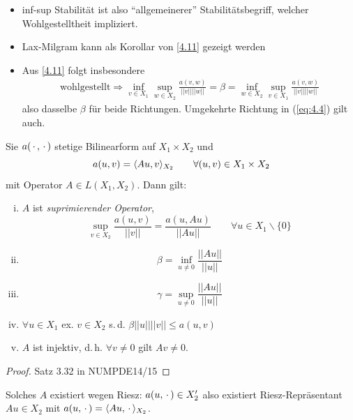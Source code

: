 \begin{bem} \beginwithlistbem
\begin{itemize}
	\item inf-sup Stabilität ist also ``allgemeinerer'' Stabilitätsbegriff, welcher Wohlgestelltheit impliziert.
	\item Lax-Milgram kann als Korollar von \ref{4.11} gezeigt werden
	\item Aus \ref{4.11} folgt insbesondere
	\begin{align} \label{eq:4.4}
		\text{wohlgestellt} \Rightarrow \inf\limits_{v \in X_1} \sup\limits_{w \in X_2} \frac{a(v,w)}{||v|| ||w||} = \beta = \inf\limits_{w \in X_2} \sup\limits_{v \in X_1} \frac{a(v,w)}{||v|| ||w||}
	\end{align}
	also dasselbe $\beta$ für beide Richtungen. Umgekehrte Richtung in (\ref{eq:4.4}) gilt auch.
\end{itemize}
\end{bem}

\begin{satz} \label{4.12}
Sie $a(\,\cdot\,,\,\cdot\,)$ stetige Bilinearform auf $X_1 \times X_2$ und
\[
	a(u,v) = \langle Au, v \rangle_{X_2} \qquad \forall (u,v) \in X_1 \times X_2
\]
mit Operator $A \in L(X_1,X_2)$. Dann gilt:
\begin{enumerate}[i)]
	\item $A$ ist \emph{suprimierender Operator},
	\[
		\sup\limits_{v \in X_2} \frac{a(u,v)}{||v||} = \frac{a(u,Au)}{||Au||} \qquad \forall u \in X_1 \backslash \{0\}
	\]
	\item \[
		\beta = \inf\limits_{u \neq 0} \frac{||Au||}{||u||}
	\]
	\item \[
		\gamma = \sup\limits_{u \neq 0} \frac{||Au||}{||u||}
	\]
	\item $\forall u \in X_1$ ex. $v \in X_2$ s.\,d. $\beta ||u|| ||v|| \leq a(u,v)$
	\item $A$ ist injektiv, d.\,h. $\forall v \neq 0$ gilt $Av \neq 0$.
\end{enumerate}
\begin{proof}
	Satz 3.32 in NUMPDE14/15
\end{proof}
\end{satz}

\begin{bem}
Solches $A$ existiert wegen Riesz: $a(u,\,\cdot\,) \in X'_2$ also existiert Riesz-Repräsentant $Au \in X_2$ mit $a(u,\,\cdot\,) = \langle Au, \,\cdot\, \rangle_{X_2}$.
\end{bem}

